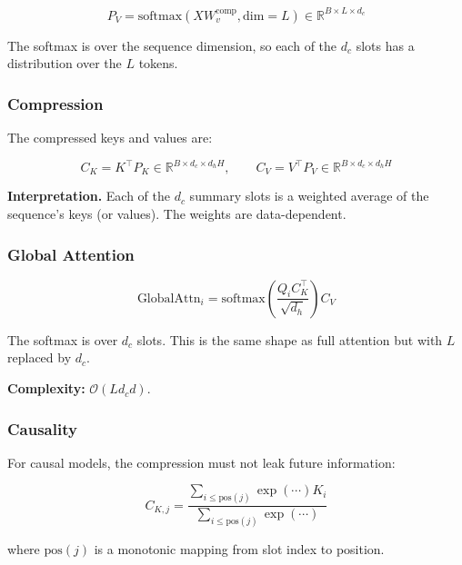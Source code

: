 \begin{equation}
P_V = \text{softmax}\!\left(X W_v^\text{comp}, \text{dim}=L\right) \in \mathbb{R}^{B \times L \times d_c}
\end{equation}

The softmax is over the sequence dimension, so each of the $d_c$ slots has 
a distribution over the $L$ tokens.

\subsubsection{Compression}

The compressed keys and values are:

\begin{equation}
C_K = K^\top P_K \in \mathbb{R}^{B \times d_c \times d_h H}, \qquad
C_V = V^\top P_V \in \mathbb{R}^{B \times d_c \times d_h H}
\end{equation}

\textbf{Interpretation.} Each of the $d_c$ summary slots is a weighted average of 
the sequence's keys (or values). The weights are data-dependent.

\subsubsection{Global Attention}

\begin{equation}
\text{GlobalAttn}_i = \text{softmax}\!\left(\frac{Q_i C_K^\top}{\sqrt{d_h}}\right) C_V
\end{equation}

The softmax is over $d_c$ slots. This is the same shape as full attention 
but with $L$ replaced by $d_c$.

\textbf{Complexity:} $\mathcal{O}(L d_c d)$.

\subsubsection{Causality}

For causal models, the compression must not leak future information:

\begin{equation}
C_{K, j} = \frac{\sum_{i \leq \text{pos}(j)} \exp(\cdots) K_i}{\sum_{i \leq \text{pos}(j)} \exp(\cdots)}
\end{equation}

where $\text{pos}(j)$ is a monotonic mapping from slot index to position.

